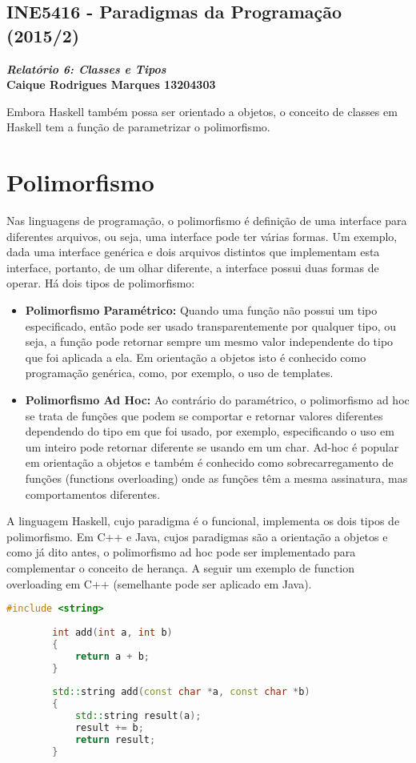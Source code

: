 \documentclass{article}
\begin{document}
\lstset{language=Haskell} %
\lstset{language=C++} %
\begin{center}
    \section*{INE5416 - Paradigmas da Programação (2015/2)}
    \textbf{\textit{Relatório 6: Classes e Tipos} \\
    Caique Rodrigues Marques 13204303}
\end{center}
    Embora Haskell também possa ser orientado a objetos, o conceito de classes em Haskell tem a função de parametrizar o polimorfismo.

\section*{Polimorfismo}
    Nas linguagens de programação, o polimorfismo é definição de uma interface para diferentes arquivos, ou seja, uma interface pode ter várias formas. Um exemplo, dada uma interface genérica e dois arquivos distintos que implementam esta interface, portanto, de um olhar diferente, a interface possui duas formas de operar. Há dois tipos de polimorfismo:
    \begin{itemize}
        \item \textbf{Polimorfismo Paramétrico: } Quando uma função não possui um tipo especificado, então pode ser usado transparentemente por qualquer tipo, ou seja, a função pode retornar sempre um mesmo valor independente do tipo que foi aplicada a ela. Em orientação a objetos isto é conhecido como programação genérica, como, por exemplo, o uso de templates.

        \item \textbf{Polimorfismo Ad Hoc:} Ao contrário do paramétrico, o polimorfismo ad hoc se trata de funções que podem se comportar e retornar valores diferentes dependendo do tipo em que foi usado, por exemplo, especificando o uso em um inteiro pode retornar diferente se usando em um char. Ad-hoc é popular em orientação a objetos e também é conhecido como sobrecarregamento de funções (functions overloading) onde as funções têm a mesma assinatura, mas comportamentos diferentes.
        \end{itemize}
        
    A linguagem Haskell, cujo paradigma é o funcional, implementa os dois tipos de polimorfismo. Em C++ e Java, cujos paradigmas são a orientação a objetos e como já dito antes, o polimorfismo ad hoc pode ser implementado para complementar o conceito de herança. A seguir um exemplo de function overloading em C++ (semelhante pode ser aplicado em Java).
    \begin{lstlisting}[language=C++, frame=single]
        #include <string>
        
        int add(int a, int b) 
        {
            return a + b;
        }
        
        std::string add(const char *a, const char *b)
        {
            std::string result(a);
            result += b;
            return result;
        }
    \end{lstlisting}
    
\end{document}
